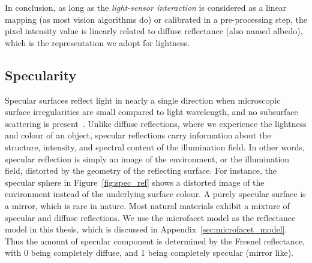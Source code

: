 In conclusion, as long as the \textit{light-sensor interaction} is considered as a linear mapping (as most vision algorithms do) or calibrated in a pre-processing step, the pixel intensity value is linearly related to diffuse reflectance (also named albedo), which is the representation we adopt for lightness.


\subsection{Specularity}
Specular surfaces reflect light in nearly a single direction when microscopic surface irregularities are small compared to light wavelength, and no subsurface scattering is present~\cite{nayar1989surface}. Unlike diffuse reflections, where we experience the lightness and colour of an object, specular reflections carry information about the structure, intensity, and spectral content of the illumination field. In other words, specular reflection is simply an image of the environment, or the illumination field, distorted by the geometry of the reflecting surface. For instance, the specular sphere in Figure~\ref{fig:spec_ref} shows a distorted image of the environment instead of the underlying surface colour. A purely specular surface is a mirror, which is rare in nature. Most natural materials exhibit a mixture of specular and diffuse reflections. We use the microfacet model as the reflectance model in this thesis, which is discussed in Appendix~\ref{sec:microfacet_model}. Thus the amount of specular component is determined by the Fresnel reflectance, with 0 being completely diffuse, and 1 being completely specular (mirror like).

